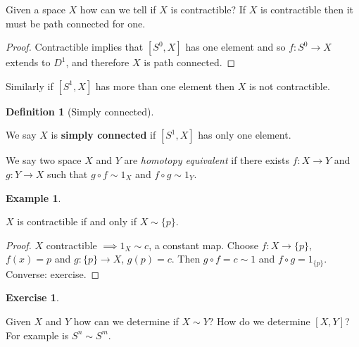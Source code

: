 \documentclass[10pt,]{article}
\newcommand{\terminology}[1]{\textbf{#1}}
\theoremstyle{plain}
\theoremstyle{definition}
\newtheorem{definition}[theorem]{Definition}
\newtheorem{example}[theorem]{Example}
\newtheorem{exercise}[theorem]{Exercise}
\begin{document}
                    Given a space \(X\) how can we tell if \(X\) is contractible? If \(X\) is
                    contractible then it must be path connected for one.

                    \begin{proof}

                        Contractible implies that \([S^0, X]\) has one element and so \(f \colon
                        S^0 \to X\) extends to \(D^1\), and therefore \(X\) is path connected. \end{proof}


                    Similarly if \([S^1, X]\) has more than one element then \(X\) is not
                    contractible.
\begin{definition}[Simply connected]\label{definition-3}

                        We say \(X\) is \terminology{simply connected} if \([S^1, X]\) has only one
                        element.

                        We say two space \(X\) and \(Y\) are \emph{homotopy equivalent} if there
                        exists \(f\colon X \to Y\) and \(g\colon Y \to X\) such that \(g\circ f
                        \sim 1_X\) and \(f\circ g \sim 1_Y\).
                    \end{definition}
\begin{example}\label{example-2}

                        \(X\) is contractible if and only if \(X \sim \{p\}\).
\begin{proof}
\(X\) contractible \(\implies 1_X \sim c\), a constant map.
                        Choose \(f\colon X \to \{p\}\), \(f(x) = p\) and \(g\colon\{p\} \to X\),
                        \(g(p) = c\). Then \(g\circ f = c \sim 1\) and \(f\circ g = 1_{\{p\}}\).
                        Converse: exercise.
                    \end{proof}
\end{example}
\begin{exercise}\label{exercise-1}
\end{exercise}
\par

                    Given \(X\) and \(Y\) how can we determine if \(X\sim Y\)?
                    How do we determine \([X,Y]\)?
                    For example is \(S^n \sim S^m\).
\typeout{************************************************}
\typeout{************************************************}
\end{document}
